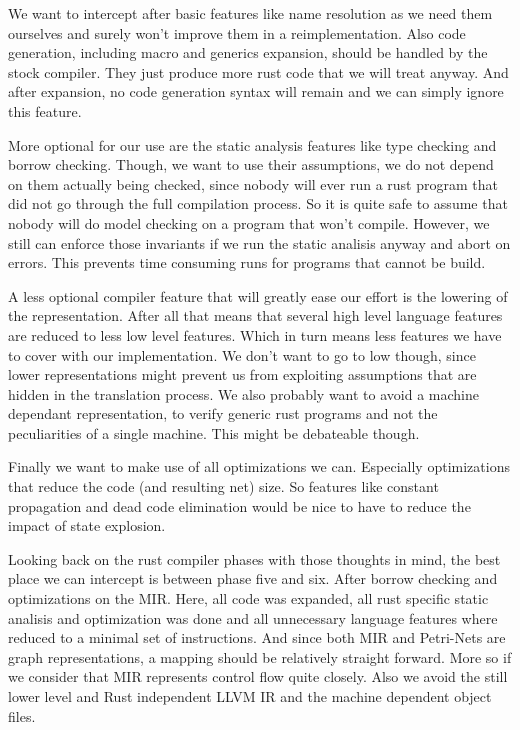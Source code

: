 We want to intercept after basic features like name resolution as we need them ourselves and surely won't improve them in a reimplementation.
Also code generation, including macro and generics expansion, should be handled by the stock compiler.
They just produce more rust code that we will treat anyway.
And after expansion, no code generation syntax will remain and we can simply ignore this feature.

More optional for our use are the static analysis features like type checking and borrow checking.
Though, we want to use their assumptions, we do not depend on them actually being checked, since nobody will ever run a rust program that did not go through the full compilation process.
So it is quite safe to assume that nobody will do model checking on a program that won't compile.
However, we still can enforce those invariants if we run the static analisis anyway and abort on errors.
This prevents time consuming runs for programs that cannot be build.

A less optional compiler feature that will greatly ease our effort is the lowering of the representation.
After all that means that several high level language features are reduced to less low level features.
Which in turn means less features we have to cover with our implementation.
We don't want to go to low though, since lower representations might prevent us from exploiting assumptions that are hidden in the translation process.
We also probably want to avoid a machine dependant representation,
to verify generic rust programs and not the peculiarities of a single machine.
This might be debateable though.

Finally we want to make use of all optimizations we can.
Especially optimizations that reduce the code (and resulting net) size.
So features like constant propagation and dead code elimination would be nice to have to reduce the impact of state explosion.

Looking back on the rust compiler phases with those thoughts in mind, the best place we can intercept is between phase five and six.
After borrow checking and optimizations on the MIR.
Here, all code was expanded, all rust specific static analisis and optimization was done and all unnecessary language features where reduced to a minimal set of instructions.
And since both MIR and Petri-Nets are graph representations, a mapping should be relatively straight forward.
More so if we consider that MIR represents control flow quite closely.
Also we avoid the still lower level and Rust independent LLVM IR and the machine dependent object files. 

